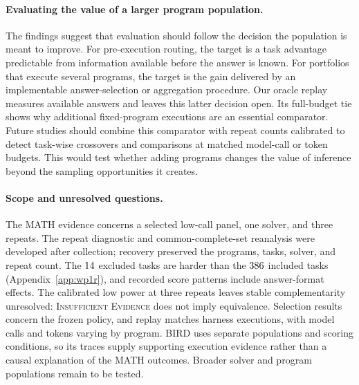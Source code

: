 \paragraph{Evaluating the value of a larger program population.}
The findings suggest that evaluation should follow the decision the
population is meant to improve. For pre-execution routing, the target is
a task advantage predictable from information available before the
answer is known. For portfolios that execute several programs, the
target is the gain delivered by an implementable answer-selection or
aggregation procedure. Our oracle replay measures available answers
and leaves this latter decision open. Its full-budget tie shows why
additional fixed-program executions are an essential comparator.
Future studies should combine this comparator with repeat counts
calibrated to detect task-wise crossovers and comparisons at matched
model-call or token budgets. This would test whether adding programs
changes the value of inference beyond the sampling opportunities it
creates.

\paragraph{Scope and unresolved questions.}
The MATH evidence concerns a selected low-call panel, one solver, and
three repeats. The repeat diagnostic and common-complete-set reanalysis
were developed after collection; recovery preserved the programs,
tasks, solver, and repeat count. The $14$ excluded tasks
are harder than the $386$ included tasks
(Appendix~\ref{app:wp1r}), and recorded score patterns include
answer-format effects. The calibrated low power at three repeats leaves
stable complementarity unresolved: \textsc{Insufficient Evidence}
does not imply equivalence. Selection results concern the frozen policy,
and replay matches harness executions, with model calls and tokens
varying by program. BIRD uses separate populations and scoring
conditions, so its traces supply supporting execution evidence rather
than a causal explanation of the MATH outcomes. Broader solver and
program populations remain to be tested.
